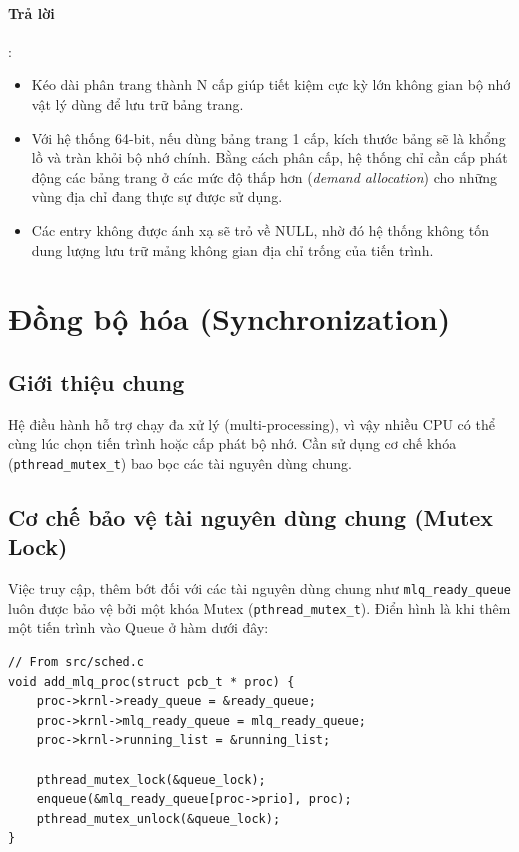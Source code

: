 \documentclass[a4paper]{article}
\begin{document}
\paragraph{Trả lời}:
\begin{itemize}
    \item Kéo dài phân trang thành N cấp giúp tiết kiệm cực kỳ lớn không gian bộ nhớ vật lý dùng để lưu trữ bảng trang.
    \item Với hệ thống 64-bit, nếu dùng bảng trang 1 cấp, kích thước bảng sẽ là khổng lồ và tràn khỏi bộ nhớ chính. Bằng cách phân cấp, hệ thống chỉ cần cấp phát động các bảng trang ở các mức độ thấp hơn (\textit{demand allocation}) cho những vùng địa chỉ đang thực sự được sử dụng.
    \item Các entry không được ánh xạ sẽ trỏ về NULL, nhờ đó hệ thống không tốn dung lượng lưu trữ mảng không gian địa chỉ trống của tiến trình.
\end{itemize}

\pagebreak

\section{Đồng bộ hóa (Synchronization)}

\subsection{Giới thiệu chung}
Hệ điều hành hỗ trợ chạy đa xử lý (multi-processing), vì vậy nhiều CPU có thể cùng lúc chọn tiến trình hoặc cấp phát bộ nhớ. Cần sử dụng cơ chế khóa (\texttt{pthread\_mutex\_t}) bao bọc các tài nguyên dùng chung.


\subsection{Cơ chế bảo vệ tài nguyên dùng chung (Mutex Lock)}
Việc truy cập, thêm bớt đối với các tài nguyên dùng chung như \texttt{mlq\_ready\_queue} luôn được bảo vệ bởi một khóa Mutex (\texttt{pthread\_mutex\_t}). Điển hình là khi thêm một tiến trình vào Queue ở hàm dưới đây:

\begin{verbatim}
// From src/sched.c
void add_mlq_proc(struct pcb_t * proc) {
    proc->krnl->ready_queue = &ready_queue;
    proc->krnl->mlq_ready_queue = mlq_ready_queue;
    proc->krnl->running_list = &running_list;

    pthread_mutex_lock(&queue_lock);
    enqueue(&mlq_ready_queue[proc->prio], proc);
    pthread_mutex_unlock(&queue_lock);	
}
\end{verbatim}
\end{document}
